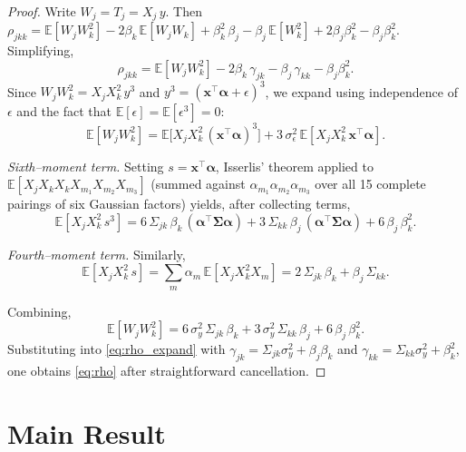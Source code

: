 \documentclass[11pt]{article}
\newcommand{\E}{\mathbb{E}}
\newcommand{\bSig}{\boldsymbol{\Sigma}}
\newcommand{\balpha}{\boldsymbol{\alpha}}
\newcommand{\bx}{\mathbf{x}}
\theoremstyle{plain}
\theoremstyle{definition}
\theoremstyle{remark}
\begin{document}
\begin{proof}
Write $W_j = T_j = X_j\,y$.  Then
$\rho_{jkk} = \E[W_j W_k^2] - 2\beta_k\,\E[W_j W_k]
+ \beta_k^2\,\beta_j - \beta_j\,\E[W_k^2]
+ 2\beta_j\beta_k^2 - \beta_j\beta_k^2$.
Simplifying,
\begin{equation}\label{eq:rho_expand}
    \rho_{jkk}
    = \E[W_j W_k^2]
      - 2\beta_k\,\gamma_{jk}
      - \beta_j\,\gamma_{kk}
      - \beta_j\beta_k^2.
\end{equation}
Since $W_j W_k^2 = X_j X_k^2\,y^3$ and
$y^3 = (\bx^\top\balpha + \epsilon)^3$,
we expand using independence of $\epsilon$
and the fact that $\E[\epsilon]=\E[\epsilon^3]=0$:
\[
    \E[W_j W_k^2]
    = \E\bigl[X_j X_k^2\,(\bx^\top\balpha)^3\bigr]
      + 3\,\sigma_\epsilon^2\,\E[X_j X_k^2\,\bx^\top\balpha].
\]

\noindent\emph{Sixth--moment term.}
Setting $s = \bx^\top\balpha$, Isserlis' theorem applied to
$\E[X_j X_k X_k X_{m_1}X_{m_2}X_{m_3}]$
(summed against $\alpha_{m_1}\alpha_{m_2}\alpha_{m_3}$
over all 15 complete pairings of six Gaussian factors) yields,
after collecting terms,
\[
    \E[X_j X_k^2\,s^3]
    = 6\,\Sigma_{jk}\,\beta_k\,(\balpha^\top\bSig\balpha)
    + 3\,\Sigma_{kk}\,\beta_j\,(\balpha^\top\bSig\balpha)
    + 6\,\beta_j\,\beta_k^2.
\]

\noindent\emph{Fourth--moment term.}
Similarly,
\[
    \E[X_j X_k^2\,s]
    = \sum_m \alpha_m\,\E[X_j X_k^2 X_m]
    = 2\,\Sigma_{jk}\,\beta_k + \beta_j\,\Sigma_{kk}.
\]

Combining,
\[
    \E[W_j W_k^2]
    = 6\,\sigma_y^2\,\Sigma_{jk}\,\beta_k
    + 3\,\sigma_y^2\,\Sigma_{kk}\,\beta_j
    + 6\,\beta_j\,\beta_k^2.
\]
Substituting into \eqref{eq:rho_expand}
with $\gamma_{jk}=\Sigma_{jk}\sigma_y^2+\beta_j\beta_k$ and
$\gamma_{kk}=\Sigma_{kk}\sigma_y^2+\beta_k^2$,
one obtains \eqref{eq:rho} after straightforward cancellation.
\end{proof}

\section{Main Result}
\end{document}
